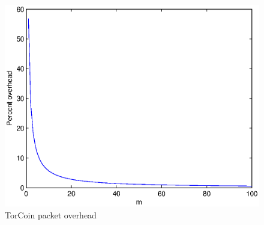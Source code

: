 \begin{figure}[t]
  \centering
    \includegraphics[scale=0.6]{graph.eps}
  \caption{TorCoin packet overhead}
\end{figure}
